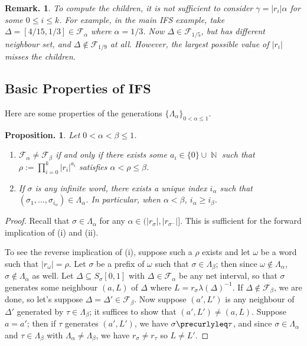 \documentclass[11pt, a4paper]{memoir}
\DeclareMathOperator{\N}{{\mathbb{N}}}
\theoremstyle{change}
\newtheorem{proposition}[theorem]{Proposition.}
\theoremstyle{plain}
\theoremstyle{nonumberplain}
\newtheorem{remark}{Remark.}
\newtheorem{proof}{Proof}
\numberwithin{equation}{section}
\begin{document}
\begin{remark}
    To compute the children, it is not sufficient to consider $\gamma=|r_i|\alpha$ for some $0\leq i \leq k$.
    For example, in the main IFS example, take $\Delta=[4/15, 1/3]\in\mathcal{F}_\alpha$ where $\alpha=1/3$.
    Now $\Delta\in \mathcal{F}_{1/5}$, but has different neighbour set, and $\Delta\notin\mathcal{F}_{1/9}$ at all.
    However, the largest possible value of $|r_i|$ misses the children.
\end{remark}
\subsection{Basic Properties of IFS}
Here are some properties of the generations $\{\Lambda_\alpha\}_{0<\alpha\leq 1}$.
\begin{proposition}\label{p:gfin}
    Let $0<\alpha<\beta\leq 1$.
    \begin{enumerate}[nl,r]
        \item $\mathcal{F}_\alpha\neq\mathcal{F}_\beta$ if and only if there exists some $a_i\in\{0\}\cup\N$ such that $\rho:=\prod_{i=0}^k |r_i|^{a_i}$ satisfies $\alpha<\rho\leq\beta$.
        \item If $\sigma$ is any infinite word, there exists a unique index $i_\alpha$ such that $(\sigma_1,\ldots,\sigma_{i_\alpha})\in\Lambda_\alpha$.
            In particular, when $\alpha<\beta$, $i_\alpha\geq i_\beta$.
    \end{enumerate}
\end{proposition}
\begin{proof}
    Recall that $\sigma\in\Lambda_\alpha$ for any $\alpha\in(|r_\sigma|,|r_{\sigma^-}|]$.
    This is sufficient for the forward implication of (i) and (ii).

    To see the reverse implication of (i), suppose such a $\rho$ exists and let $\omega$ be a word such that $|r_\omega|=\rho$.
    Let $\sigma$ be a prefix of $\omega$ such that $\sigma\in\Lambda_\beta$; then since $\omega\notin\Lambda_\alpha$, $\sigma\notin\Lambda_\alpha$ as well.
    Let $\Delta\subseteq S_\sigma[0,1]$ with $\Delta\in\mathcal{F}_\alpha$ be any net interval, so that $\sigma$ generates some neighbour $(a,L)$ of $\Delta$ where $L=r_\sigma \lambda(\Delta)^{-1}$.
    If $\Delta\notin\mathcal{F}_\beta$, we are done, so let's suppose $\Delta=\Delta'\in\mathcal{F}_\beta$.
    Now suppose $(a',L')$ is any neighbour of $\Delta'$ generated by $\tau\in\Lambda_\beta$; it suffices to show that $(a',L')\neq(a,L)$.
    Suppose $a=a'$; then if $\tau$ generates $(a',L')$, we have $\sigma\precurlyleq\tau$, and since $\sigma\in\Lambda_\alpha$ and $\tau\in\Lambda_\beta$ with $\Lambda_\alpha\neq\Lambda_\beta$, we have $r_\sigma\neq r_\tau$ so $L\neq L'$.
\end{proof}
\end{document}
